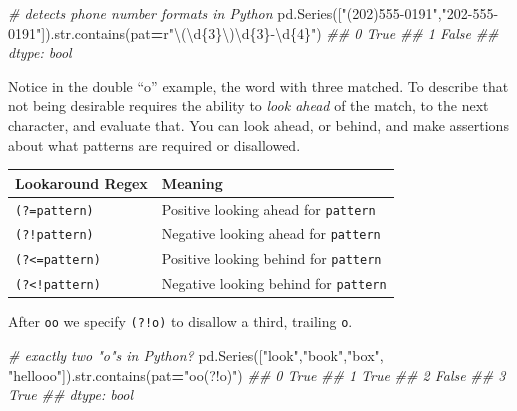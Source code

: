 \documentclass[
  12pt,
  krantz2]{krantz}
\makeatletter
\newenvironment{Shaded}{\begin{snugshade}}{\end{snugshade}}
\newcommand{\BuiltInTok}[1]{#1}
\newcommand{\CommentTok}[1]{\textcolor[rgb]{0.37,0.37,0.37}{\textit{#1}}}
\newcommand{\NormalTok}[1]{#1}
\newcommand{\OperatorTok}[1]{\textcolor[rgb]{0.43,0.43,0.43}{\textbf{#1}}}
\newcommand{\SpecialCharTok}[1]{\textcolor[rgb]{0,0,0}{#1}}
\newcommand{\StringTok}[1]{\textcolor[rgb]{0.5,0.5,0.5}{#1}}
\newcommand{\VerbatimStringTok}[1]{\textcolor[rgb]{0.5,0.5,0.5}{#1}}
\newenvironment{kframe}{%
\medskip{}
\setlength{\fboxsep}{.8em}
 \def\at@end@of@kframe{}%
 \ifinner\ifhmode%
  \def\at@end@of@kframe{\end{minipage}}%
  \begin{minipage}{\columnwidth}%
 \fi\fi%
 \def\FrameCommand##1{\hskip\@totalleftmargin \hskip-\fboxsep
 \colorbox{shadecolor}{##1}\hskip-\fboxsep
     \hskip-\linewidth \hskip-\@totalleftmargin \hskip\columnwidth}%
 \MakeFramed {\advance\hsize-\width
   \@totalleftmargin\z@ \linewidth\hsize
   \@setminipage}}%
 {\par\unskip\endMakeFramed%
 \at@end@of@kframe}
\renewenvironment{Shaded}{\begin{kframe}}{\end{kframe}}
\makeatother
\begin{document}
\begin{Shaded}
\begin{Highlighting}[]
\CommentTok{\# detects phone number formats in Python}
\NormalTok{pd.Series([}\StringTok{"(202)555{-}0191"}\NormalTok{,}\StringTok{"202{-}555{-}0191"}\NormalTok{]).}\BuiltInTok{str}\NormalTok{.contains(pat}\OperatorTok{=}\VerbatimStringTok{r"\textbackslash{}(\textbackslash{}d}\SpecialCharTok{\{3\}}\VerbatimStringTok{\textbackslash{})\textbackslash{}d}\SpecialCharTok{\{3\}}\VerbatimStringTok{{-}\textbackslash{}d}\SpecialCharTok{\{4\}}\VerbatimStringTok{"}\NormalTok{)}
\CommentTok{\#\# 0     True}
\CommentTok{\#\# 1    False}
\CommentTok{\#\# dtype: bool}
\end{Highlighting}
\end{Shaded}

Notice in the double ``o'' example, the word with three matched. To describe that not being desirable requires the ability to \emph{look ahead} of the match, to the next character, and evaluate that. You can look ahead, or behind, and make assertions about what patterns are required or disallowed.

\begin{longtable}[]{@{}ll@{}}
\toprule
Lookaround Regex & Meaning \\
\midrule
\endhead
\texttt{(?=pattern)} & Positive looking ahead for \texttt{pattern} \\
\texttt{(?!pattern)} & Negative looking ahead for \texttt{pattern} \\
\texttt{(?\textless{}=pattern)} & Positive looking behind for \texttt{pattern} \\
\texttt{(?\textless{}!pattern)} & Negative looking behind for \texttt{pattern} \\
\bottomrule
\end{longtable}

After \texttt{oo} we specify \texttt{(?!o)} to disallow a third, trailing \texttt{o}.

\begin{Shaded}
\begin{Highlighting}[]
\CommentTok{\# exactly two "o"s in Python?}
\NormalTok{pd.Series([}\StringTok{"look"}\NormalTok{,}\StringTok{"book"}\NormalTok{,}\StringTok{"box"}\NormalTok{, }\StringTok{"hellooo"}\NormalTok{]).}\BuiltInTok{str}\NormalTok{.contains(pat}\OperatorTok{=}\StringTok{"oo(?!o)"}\NormalTok{)}
\CommentTok{\#\# 0     True}
\CommentTok{\#\# 1     True}
\CommentTok{\#\# 2    False}
\CommentTok{\#\# 3     True}
\CommentTok{\#\# dtype: bool}
\end{Highlighting}
\end{Shaded}
\end{document}
